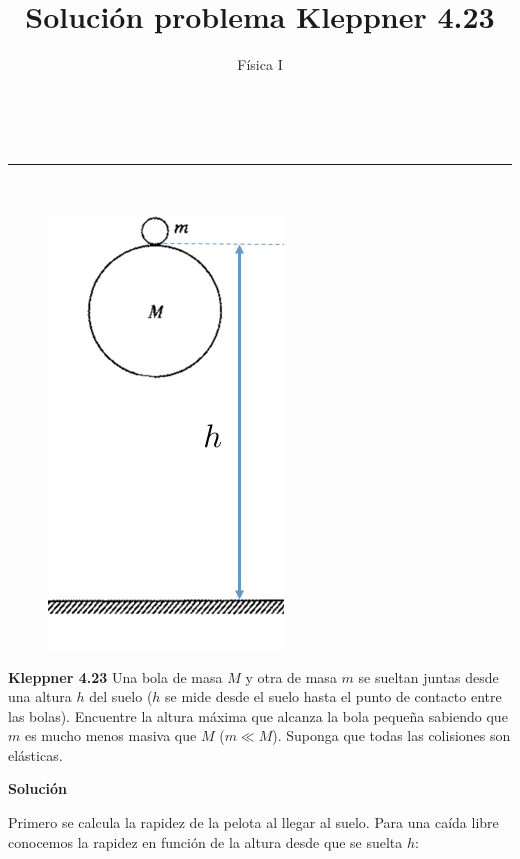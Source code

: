 \documentclass[a4paper,11pt]{article}
\makeatletter
\newcommand{\linia}{\rule{\linewidth}{0.5pt}}
\renewcommand{\maketitle}{
\begin{center}
\vspace{2ex}
{\huge \textsc{\@title}}
\vspace{1ex}
\\
\linia\\
\@author \hfill \@date
\vspace{4ex}
\end{center}
}
\makeatother
\begin{document}
\title{Solución problema Kleppner 4.23}

\author{Física I}

\date{}

\maketitle

\color{blue}
\setlength\intextsep{-10pt}


\begin{figure}
	\includegraphics[scale=0.7]{./im/1}
\end{figure}





\color{pb}
\textbf{Kleppner 4.23} \color{black} Una bola de masa $M$ y otra de masa $m$ se sueltan juntas desde una altura $h$ del suelo ($h$ se mide desde el suelo hasta el punto de contacto entre las bolas). Encuentre la altura máxima que alcanza la bola pequeña sabiendo que $m$ es mucho menos masiva que $M$ ($m\ll M$). Suponga que todas las colisiones son elásticas.




\begin{center}
	\color{pb}
\textbf{Solución}
\color{black}
\end{center}
Primero se calcula la rapidez de la pelota al llegar al suelo. Para una caída libre conocemos la rapidez en función de la altura desde que se suelta $h$:
\end{document}
